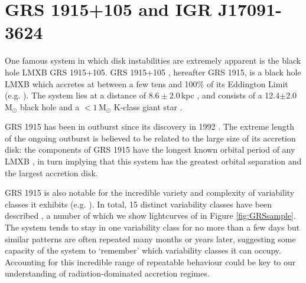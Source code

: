 \section{GRS 1915+105 and IGR J17091-3624}

\label{sec:1915}

\par One famous system in which disk instabilities are extremely apparent is the black hole LMXB GRS 1915+105.  GRS 1915+105 \citep{CastroTirado_GRS1915}, hereafter GRS 1915, is a black hole LMXB which accretes at between a few tens and 100\% of its Eddington Limit (e.g. \citealp{Vilhu_SupEd,Done_GRS_HighAcc,Fender_DiskJet}).  The system lies at a distance of $8.6\pm2.0$\,kpc \citep{Reid_Parallax}, and consists of a 12.4$\pm$2.0\,M$_\odot$ black hole and a $<1$\,M$_\odot$ K-class giant star \citep{Reid_Parallax,Ziolkowski_GRSDonor}.
\par GRS 1915 has been in outburst since its discovery in 1992 \citep{CastroTirado_GRS1915}.  The extreme length of the ongoing outburst is believed to be related to the large size of its accretion disk: the components of GRS 1915 have the longest known orbital period of any LMXB \citep{Greiner_BigDisk}, in turn implying that this system has the greatest orbital separation and the largest accretion disk.
\par GRS 1915 is also notable for the incredible variety and complexity of variability classes it exhibits (e.g. \citealp{Yadav_GRSBursts,Belloni_GRS_MI}).  In total, 15 distinct variability classes have been described \citep{Belloni_GRS_MI,KleinWolt_OmegaClass,Hannikainen_NewClass, Pahari_NewClass}, a number of which we show lightcurves of in Figure \ref{fig:GRSsample}.  The system tends to stay in one variability class for no more than a few days but similar patterns are often repeated many months or years later, suggesting some capacity of the system to `remember' which variability classes it can occupy.  Accounting for this incredible range of repeatable behaviour could be key to our understanding of radiation-dominated accretion regimes.

